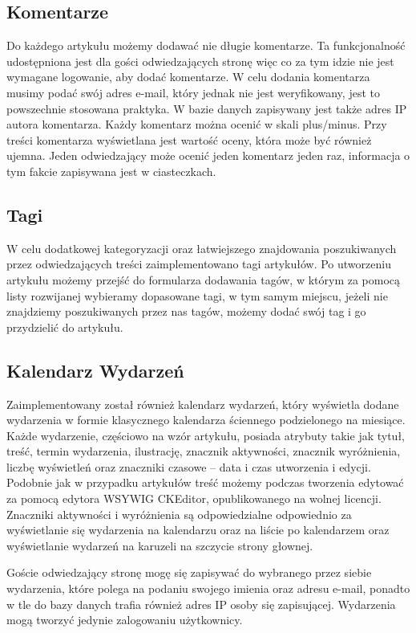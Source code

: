 \documentclass[openright]{xmgr}
\begin{document}
\subsection{Komentarze}
Do każdego artykułu możemy dodawać nie długie komentarze. Ta funkcjonalność udostępniona jest dla gości odwiedzających stronę więc co za tym idzie nie jest wymagane logowanie, aby dodać komentarze. W celu dodania komentarza musimy podać swój adres e-mail, który jednak nie jest weryfikowany, jest to powszechnie stosowana praktyka. W bazie danych zapisywany jest także adres IP autora komentarza. Każdy komentarz można ocenić w skali plus/minus. Przy treści komentarza wyświetlana jest wartość oceny, która może być również ujemna. Jeden odwiedzający może ocenić jeden komentarz jeden raz, informacja o tym fakcie zapisywana jest w ciasteczkach.

\subsection{Tagi}
W celu dodatkowej kategoryzacji oraz łatwiejszego znajdowania poszukiwanych przez odwiedzających treści zaimplementowano tagi artykułów. Po utworzeniu artykułu możemy przejść do formularza dodawania tagów, w którym za pomocą listy rozwijanej wybieramy dopasowane tagi, w tym samym miejscu, jeżeli nie znajdziemy poszukiwanych przez nas tagów, możemy dodać swój tag i go przydzielić do artykułu.

\subsection{Kalendarz Wydarzeń}
Zaimplementowany został również kalendarz wydarzeń, który wyświetla dodane wydarzenia w formie klasycznego kalendarza ściennego podzielonego na miesiące. Każde wydarzenie, częściowo na wzór artykułu, posiada atrybuty takie jak tytuł, treść, termin wydarzenia, ilustrację, znacznik aktywności, znacznik wyróżnienia, liczbę wyświetleń oraz znaczniki czasowe – data i czas utworzenia i edycji. Podobnie jak w przypadku artykułów treść możemy podczas tworzenia  edytować za pomocą edytora WSYWIG CKEditor, opublikowanego na wolnej licencji. Znaczniki aktywności i wyróżnienia są odpowiedzialne odpowiednio za wyświetlanie się wydarzenia na kalendarzu oraz na liście po kalendarzem oraz wyświetlanie wydarzeń na karuzeli na szczycie strony głownej. 

Goście odwiedzający stronę mogę się zapisywać do wybranego przez siebie wydarzenia, które polega na podaniu swojego imienia oraz adresu e-mail, ponadto w tle do bazy danych trafia również adres IP osoby się zapisującej. Wydarzenia mogą tworzyć jedynie zalogowaniu użytkownicy.
\end{document}
